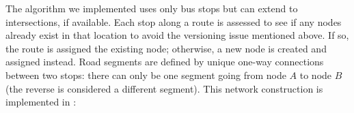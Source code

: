 The algorithm we implemented uses only bus stops but can extend to intersections, if available. Each stop along a route is assessed to see if any nodes already exist in that location to avoid the versioning issue mentioned above. If so, the route is assigned the existing node; otherwise, a new node is created and assigned instead. Road segments are defined by unique one-way connections between two stops: there can only be one segment going from node $A$ to node $B$ (the reverse is considered a different segment). This network construction is implemented in :
\begin{knitrout}\small
{}\color{fgcolor}
\end{knitrout}
